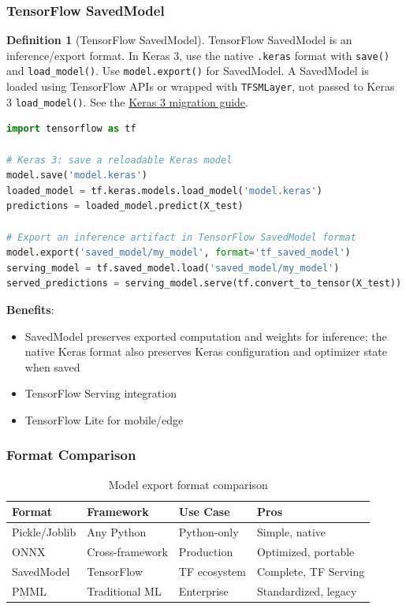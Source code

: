 \documentclass[11pt,twoside]{article}
\numberwithin{equation}{section}
\theoremstyle{plain}
\theoremstyle{definition}
\newtheorem{definition}[theorem]{Definition}
\theoremstyle{remark}
\begin{document}
\subsubsection{TensorFlow SavedModel}

\begin{definition}[TensorFlow SavedModel]
TensorFlow SavedModel is an inference/export format. In Keras 3, use the native \texttt{.keras} format with \texttt{save()} and \texttt{load\_model()}. Use \texttt{model.export()} for SavedModel. A SavedModel is loaded using TensorFlow APIs or wrapped with \texttt{TFSMLayer}, not passed to Keras 3 \texttt{load\_model()}. See the \href{https://keras.io/guides/migrating_to_keras_3/}{Keras 3 migration guide}.

\begin{lstlisting}[language=Python]
import tensorflow as tf

# Keras 3: save a reloadable Keras model
model.save('model.keras')
loaded_model = tf.keras.models.load_model('model.keras')
predictions = loaded_model.predict(X_test)

# Export an inference artifact in TensorFlow SavedModel format
model.export('saved_model/my_model', format='tf_saved_model')
serving_model = tf.saved_model.load('saved_model/my_model')
served_predictions = serving_model.serve(tf.convert_to_tensor(X_test))
\end{lstlisting}

\textbf{Benefits}:
\begin{itemize}
\item SavedModel preserves exported computation and weights for inference; the native Keras format also preserves Keras configuration and optimizer state when saved
\item TensorFlow Serving integration
\item TensorFlow Lite for mobile/edge
\end{itemize}
\end{definition}

\subsubsection{Format Comparison}

\begin{table}[H]
\centering
\begin{tabular}{@{}llll@{}}
\toprule
\textbf{Format} & \textbf{Framework} & \textbf{Use Case} & \textbf{Pros} \\
\midrule
Pickle/Joblib & Any Python & Python-only & Simple, native \\
ONNX & Cross-framework & Production & Optimized, portable \\
SavedModel & TensorFlow & TF ecosystem & Complete, TF Serving \\
PMML & Traditional ML & Enterprise & Standardized, legacy \\
\bottomrule
\end{tabular}
\caption{Model export format comparison}
\end{table}
\end{document}

